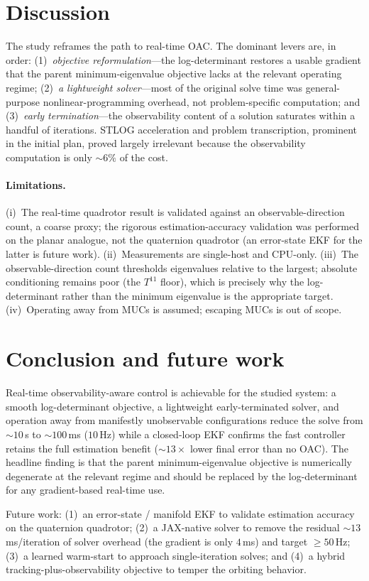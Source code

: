 \documentclass[11pt]{article}
\begin{document}
\section{Discussion}

The study reframes the path to real-time OAC. The dominant levers are, in order:
(1)~\emph{objective reformulation}---the log-determinant restores a usable gradient that the
parent minimum-eigenvalue objective lacks at the relevant operating regime;
(2)~\emph{a lightweight solver}---most of the original solve time was general-purpose
nonlinear-programming overhead, not problem-specific computation; and
(3)~\emph{early termination}---the observability content of a solution saturates within a
handful of iterations. STLOG acceleration and problem transcription, prominent in the initial
plan, proved largely irrelevant because the observability computation is only ${\sim}6\%$ of
the cost.

\paragraph{Limitations.}
(i)~The real-time quadrotor result is validated against an observable-direction count, a
coarse proxy; the rigorous estimation-accuracy validation was performed on the planar
analogue, not the quaternion quadrotor (an error-state EKF for the latter is future work).
(ii)~Measurements are single-host and CPU-only.
(iii)~The observable-direction count thresholds eigenvalues relative to the largest; absolute
conditioning remains poor (the $T^{11}$ floor), which is precisely why the log-determinant
rather than the minimum eigenvalue is the appropriate target.
(iv)~Operating away from MUCs is assumed; escaping MUCs is out of scope.

\section{Conclusion and future work}

Real-time observability-aware control is achievable for the studied system: a smooth
log-determinant objective, a lightweight early-terminated solver, and operation away from
manifestly unobservable configurations reduce the solve from ${\sim}10$\,s to ${\sim}100$\,ms
($10$\,Hz) while a closed-loop EKF confirms the fast controller retains the full estimation
benefit (${\sim}13\times$ lower final error than no OAC). The headline finding is that the
parent minimum-eigenvalue objective is numerically degenerate at the relevant regime and
should be replaced by the log-determinant for any gradient-based real-time use.

Future work: (1)~an error-state / manifold EKF to validate estimation accuracy on the
quaternion quadrotor; (2)~a JAX-native solver to remove the residual ${\sim}13$\,ms/iteration
of solver overhead (the gradient is only $4$\,ms) and target $\ge 50$\,Hz; (3)~a learned
warm-start to approach single-iteration solves; and (4)~a hybrid tracking-plus-observability
objective to temper the orbiting behavior.
\end{document}
